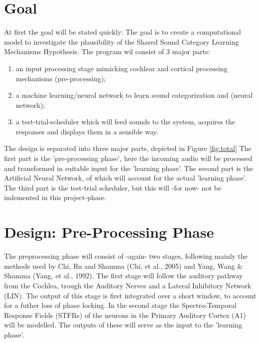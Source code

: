 \documentclass{article}
\begin{document}
\section{Goal}
At first the goal will be stated quickly: The goal is to create a computational model to investigate the plausibility of the Shared Sound Category Learning Mechanisms Hypothesis. The program wil consist of 3 major parts: 
\begin{enumerate}
	\item an input processing stage mimicking cochlear and cortical processing mechanisms (pre-processing); 
	\item a machine learning/neural network to learn sound categorization and (neural network); 
	\item a test-trial-scheduler which will feed sounds to the system, acquires the responses and displays them in a sensible way.
\end{enumerate}
The design is separated into three major parts, depicted in Figure \ref{fig:total} The first part is the 'pre-processing phase', here the incoming audio will be processed and transformed in suitable input for the 'learning phase'. The second part is the Artificial Neural Network, of which will account for the actual 'learning phase'. The third part is the test-trial scheduler, but this will -for now- not be imlemented in this project-phase.

\section{Design: Pre-Processing Phase}
The preprocessing phase will consist of -again- two stages, following mainly the methods used by Chi, Ru and Shamma (Chi, et al., 2005) and Yang, Wang \& Shamma (Yang, et al., 1992). The first stage will follow the auditory pathway from the Cochlea, trough the Auditory Nerves and a Lateral Inhibitory Network (LIN). The output of this stage is first integrated over a short window, to account for a futher loss of phase locking. In the second stage the Spectro-Temporal Response Fields (STFRs) of the neurons in the Primary Auditory Cortex (A1) will be modelled. The outputs of these will serve as the input to the 'learning phase'.
\end{document}
